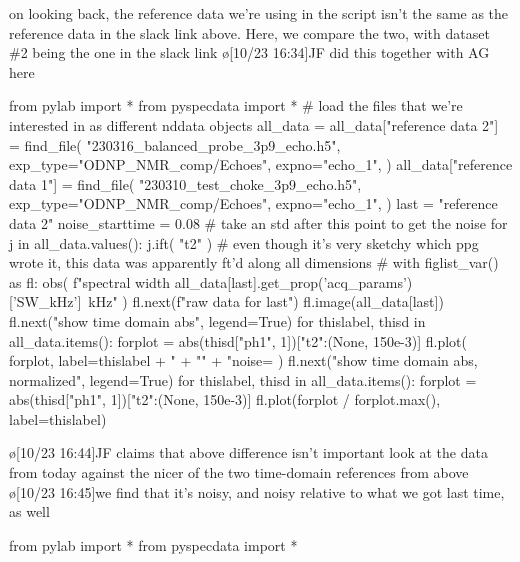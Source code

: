 \begin{err}
    on looking back, the reference data we're using in the script isn't
    the same as the reference data in the slack link above.
    Here, we compare the two, with dataset \#2 being the one in the slack link
    \o[10/23 16:34]{JF did this together with AG here}
    \par
\begin{python}[on]
from pylab import *
from pyspecdata import *
# {{{ load the files that we're interested in as different nddata objects
all_data = {}
all_data["reference data 2"] = find_file(
    "230316_balanced_probe_3p9_echo.h5",
    exp_type="ODNP_NMR_comp/Echoes",
    expno="echo_1",
)
all_data["reference data 1"] = find_file(
    "230310_test_choke_3p9_echo.h5",
    exp_type="ODNP_NMR_comp/Echoes",
    expno="echo_1",
)
last = "reference data 2"
noise_starttime = 0.08 # take an std after this point to get the noise
for j in all_data.values():
    j.ift(
        "t2"
    )  # even though it's very sketchy which ppg wrote it, this data was apparently ft'd along all dimensions
# }}}
with figlist_var() as fl:
    obs(
        f"spectral width {all_data[last].get_prop('acq_params')['SW_kHz']}~kHz"
    )
    fl.next(f"raw data for {last}")
    fl.image(all_data[last])
    fl.next("show time domain abs", legend=True)
    for thislabel, thisd in all_data.items():
        forplot = abs(thisd["ph1", 1])["t2":(None, 150e-3)]
        fl.plot(
            forplot,
            label=thislabel
            + "\n%
            + "\n"
            + "noise= %
        )
    fl.next("show time domain abs, normalized", legend=True)
    for thislabel, thisd in all_data.items():
        forplot = abs(thisd["ph1", 1])["t2":(None, 150e-3)]
        fl.plot(forplot / forplot.max(), label=thislabel)
\end{python}
    \par
    \o[10/23 16:44]{JF claims that above difference isn't important}
    look at the data from today against the nicer of the two time-domain references from above
    \o[10/23 16:45]{we find that it's noisy, and noisy relative to what we got last time, as well}
    \par
    \begin{python}[on]
from pylab import *
from pyspecdata import *


\end{python}
\end{err}
